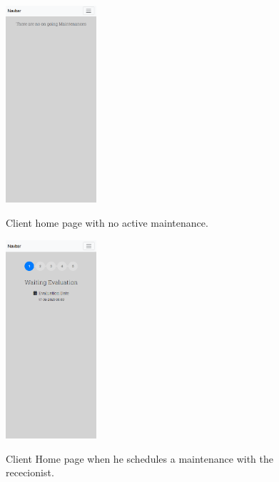 \begin{figure}[htbp]
  \caption{Client home page with no active maintenance.}
  \centering
  \includegraphics[width=0.30\textwidth]{figs/Implementation/client/MaintenanceNoState}
  \label{fig:MaintenanceNoState}
\end{figure}



\begin{figure}[htbp]
  \caption{Client Home page when he schedules a maintenance with the rececionist.}
  \centering
  \includegraphics[width=0.30\textwidth]{figs/Implementation/client/MaintenanceState1}
  \label{fig:MaintenanceState1}
\end{figure}




